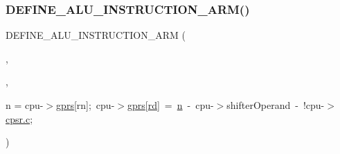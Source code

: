 \subsubsection{\texorpdfstring{D\+E\+F\+I\+N\+E\+\_\+\+A\+L\+U\+\_\+\+I\+N\+S\+T\+R\+U\+C\+T\+I\+O\+N\+\_\+\+A\+R\+M()}{DEFINE\_ALU\_INSTRUCTION\_ARM()}\hspace{0.1cm}{\footnotesize\ttfamily [6/6]}}
{\footnotesize\ttfamily D\+E\+F\+I\+N\+E\+\_\+\+A\+L\+U\+\_\+\+I\+N\+S\+T\+R\+U\+C\+T\+I\+O\+N\+\_\+\+A\+RM (\begin{DoxyParamCaption}\item[{S\+BC}]{,  }\item[{\mbox{\hyperlink{isa-arm_8c_a75841dc674f77a6e718777bfc729d5f9}{A\+R\+M\+\_\+\+S\+U\+B\+T\+R\+A\+C\+T\+I\+O\+N\+\_\+\+C\+A\+R\+R\+Y\+\_\+S}}(\mbox{\hyperlink{isa-lr35902_8c_ae54e54065504090672c92ef62a1c5f05}{n}}, cpu-\/$>$shifter\+Operand, cpu-\/$>$\mbox{\hyperlink{isa-thumb_8c_a6b4b7e13a9a144391615b217c5917bc7}{gprs}}\mbox{[}\mbox{\hyperlink{isa-arm_8c_a555541ce18ed9b5fad657a06b22cb465}{rd}}\mbox{]}, !cpu-\/$>$\mbox{\hyperlink{isa-lr35902_8c_ab27f9f98dd173bfc694f5d161e839d6e}{cpsr.\+c}})}]{,  }\item[{int32\+\_\+t}]{n = {\ttfamily cpu-\/$>$\mbox{\hyperlink{isa-thumb_8c_a6b4b7e13a9a144391615b217c5917bc7}{gprs}}\mbox{[}rn\mbox{]};~cpu-\/$>$\mbox{\hyperlink{isa-thumb_8c_a6b4b7e13a9a144391615b217c5917bc7}{gprs}}\mbox{[}\mbox{\hyperlink{isa-arm_8c_a555541ce18ed9b5fad657a06b22cb465}{rd}}\mbox{]}~=~\mbox{\hyperlink{isa-lr35902_8c_ae54e54065504090672c92ef62a1c5f05}{n}}~-\/~cpu-\/$>$shifterOperand~-\/~!cpu-\/$>$\mbox{\hyperlink{isa-lr35902_8c_ab27f9f98dd173bfc694f5d161e839d6e}{cpsr.\+c}};} }\end{DoxyParamCaption})}

\mbox{\label{isa-arm_8c_a8f02ed65b3e555e19b0323751d343a5b}} 
